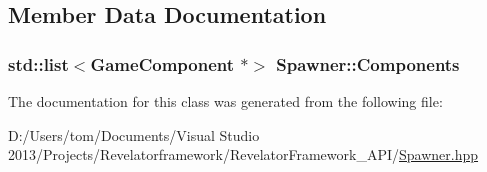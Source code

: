 \subsection{Member Data Documentation}
\hypertarget{class_spawner_ae5e316957ac1574347ba80bac3866976}{
\subsubsection[{Components}]{\setlength{\rightskip}{0pt plus 5cm}std\-::list$<${\bf Game\-Component} $\ast$$>$ Spawner\-::\-Components\hspace{0.3cm}{\ttfamily [private]}}}\label{class_spawner_ae5e316957ac1574347ba80bac3866976}


The documentation for this class was generated from the following file\-:\begin{DoxyCompactItemize}
\item 
D\-:/\-Users/tom/\-Documents/\-Visual Studio 2013/\-Projects/\-Revelatorframework/\-Revelator\-Framework\-\_\-\-A\-P\-I/\hyperlink{_spawner_8hpp}{Spawner.\-hpp}\end{DoxyCompactItemize}

